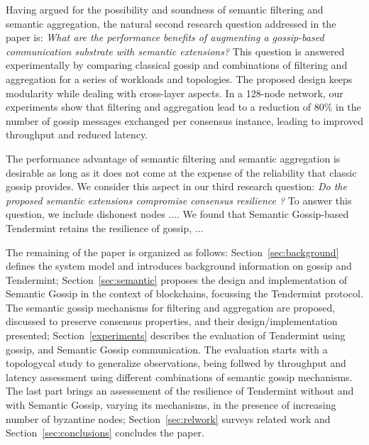 Having argued for the possibility and soundness of semantic filtering and semantic aggregation, the natural second research question addressed in the paper is: \emph{What are the performance benefits of augmenting a gossip-based communication substrate with semantic extensions?}
This question is answered experimentally by comparing classical gossip and combinations of filtering and aggregation for a series of workloads and topologies. The proposed design keeps modularity while dealing with cross-layer aspects.
%
In a 128-node network, our experiments show that filtering and aggregation lead to a reduction of 80\% in the number of gossip messages exchanged per consensus instance, leading to improved throughput and reduced latency.


The performance advantage of semantic filtering and semantic aggregation is desirable as long as it does not come at the expense of the reliability that classic gossip provides.
We consider this aspect in our third research question: 
\emph{Do the proposed semantic extensions compromise consensus resilience ?}
To answer this question, we include dishonest nodes ....
%
We found that Semantic Gossip-based Tendermint retains the resilience of gossip, ... 


The remaining of the paper is organized as follows:
    Section~\ref{sec:background} defines the system model and introduces background information on gossip and Tendermint;
    Section~\ref{sec:semantic} proposes the design and implementation of Semantic Gossip in the context of blockchains, focussing the Tendermint protocol.  
    The semantic gossip mechanisms for filtering and aggregation are proposed,
    discussed to preserve consensus properties, and their design/implementation presented;
 Section~\ref{experiments} describes the evaluation of Tendermint using gossip, and Semantic Gossip communication.   The evaluation starts with a topologycal study to generalize observations, being follwed by throughput and latency assessment using different combinations of semantic gossip mechanisms.
    The last part brings an assessement of the resilience of Tendermint without and with Semantic Gossip, varying its mechanisms, in the presence of increasing number of byzantine nodes;
    Section~\ref{sec:relwork} surveys related work and Section~\ref{sec:conclusions} concludes the paper.
    